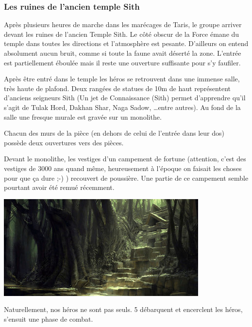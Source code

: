 \newpage
\subsubsection{Les ruines de l’ancien temple Sith}

Après plusieurs heures de marche dans les marécages de Taris, le groupe arriver devant les ruines de l’ancien Temple Sith. Le côté obscur de la Force émane du temple dans toutes les directions et l’atmosphère est pesante. D’ailleurs on entend absolument aucun bruit, comme si toute la faune avait déserté la zone. L’entrée est partiellement éboulée mais il reste une ouverture suffisante pour s’y faufiler.

Après être entré dans le temple les héros se retrouvent dans une immense salle, très haute de plafond. Deux rangées de statues de 10m de haut représentent d’anciens seigneurs Sith (Un jet de Connaissance (Sith) permet d’apprendre qu’il s’agit de Tulak Hord, Dakhan Shar, Naga Sadow, \ldots entre autres). Au fond de la salle une fresque murale est gravée sur un monolithe.

Chacun des murs de la pièce (en dehors de celui de l’entrée dans leur dos) possède deux ouvertures vers des pièces.

Devant le monolithe, les vestiges d’un campement de fortune (attention, c’est des vestiges de 3000 ans quand même, heureusement à l’époque on faisait les choses pour que ça dure ;-) ) recouvert de poussière. Une partie de ce campement semble pourtant avoir été remué récemment.

\vspace{4\baselineskip}
\noindent\includegraphics[width=\textwidth]{_img/places/taris-temple-sith.jpg}

\newpage

Naturellement, nos héros ne sont pas seuls. 5  débarquent et encerclent les héros, s’ensuit une phase de combat.
\\

